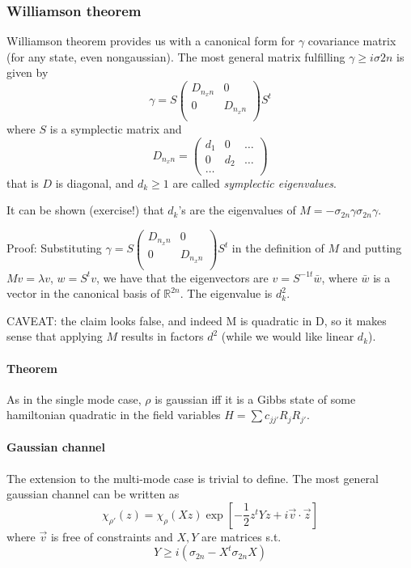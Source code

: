 \documentclass[a4paper, 11pt]{article}
\begin{document}
	\subsubsection{Williamson theorem}
	Williamson theorem provides us with a canonical form for $\gamma$ covariance matrix (for any state, even nongaussian). The most general matrix fulfilling $\gamma\ge i \sigma{2n}$ is given by
	\[ \gamma = S\begin{pmatrix}
	D_{n _x n} & 0 \\
	0 & D_{n _x n} \\
	\end{pmatrix} S^t \]
	where $S$ is a symplectic matrix and
	\[ D_{n _x n} = \begin{pmatrix}
	d_1 & 0 & \dots \\
	0 & d_2 & \dots \\
	\dots
	\end{pmatrix} \]
	that is $D$ is diagonal, and $d_k\ge 1$ are called \emph{symplectic eigenvalues}.
	
	It can be shown (exercise!) that $d_k$'s are the eigenvalues of $M = -\sigma_{2n} \gamma \sigma_{2n}\gamma$.

	\noindent Proof: Substituting $\gamma = S\begin{pmatrix}
	D_{n _x n} & 0 \\
	0 & D_{n _x n} \\
	\end{pmatrix} S^t$ in the definition of $M$ and putting $Mv = \lambda v$, $w = S^t v$, we have that the eigenvectors are $v = S^{-1t} \bar{w}$, where $\bar{w}$ is a vector in the canonical basis of $\mathbb{R}^{2n}$. The eigenvalue is $d_k^2$.
	
	\noindent CAVEAT: the claim looks false, and indeed M is quadratic in D, so it makes sense that applying $M$ results in factors $d^2$ (while we would like linear $d_k$).
	
	\paragraph{Theorem} As in the single mode case, $\rho$ is gaussian iff it is a Gibbs state of some hamiltonian quadratic in the field variables $H = \sum c_{jj'}R_jR_{j'}$.
	
	\paragraph{Gaussian channel}
	The extension to the multi-mode case is trivial to define. The most general gaussian channel can be written as
	\[ \chi_{\rho'}(z) = \chi_\rho(Xz) \exp\left[ -\frac{1}{2} z^tYz + i\vec{v} \cdot \vec{z} \right] \]
	where $\vec{v}$ is free of constraints and $X,Y$ are matrices s.t.
	\[ Y \ge i (\sigma_{2n} - X^t \sigma_{2n} X) \]
	
\end{document}
